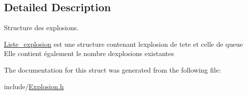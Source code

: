 \subsection{Detailed Description}
Structure des explosions. 

\hyperlink{struct_liste__explosion}{Liste\+\_\+explosion} est une structure contenant l\textquotesingle{}explosion de tete et celle de queue Elle contient également le nombre d\textquotesingle{}explosions existantes 

The documentation for this struct was generated from the following file\+:\begin{DoxyCompactItemize}
\item 
include/\hyperlink{_explosion_8h}{Explosion.\+h}\end{DoxyCompactItemize}
